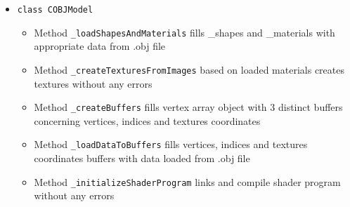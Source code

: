 \documentclass{report}
\begin{document}
\begin{itemize}
%
%	
\item \texttt{class COBJModel}
		\begin{itemize}
			\item Method \texttt{\_loadShapesAndMaterials} fills \_shapes and \_materials with appropriate data from .obj file
			\item Method \texttt{\_createTexturesFromImages} based on loaded materials creates textures without any errors
			\item Method \texttt{\_createBuffers} fills vertex array object with 3 distinct buffers concerning vertices, indices and textures coordinates
			\item Method \texttt{\_loadDataToBuffers} fills vertices, indices and textures coordinates buffers with data loaded from .obj file
			\item Method \texttt{\_initializeShaderProgram} links and compile shader program without any errors
		\end{itemize}	
		
\end{itemize}
\end{document}
